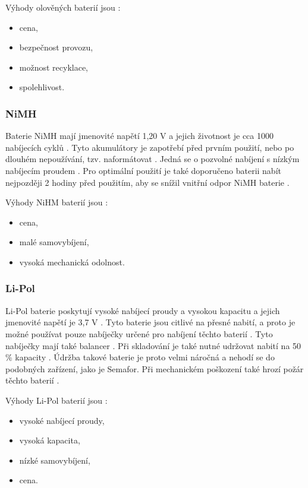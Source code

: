 Výhody olověných baterií jsou \cite{olovene}:
\begin{itemize}
  \item cena,
  \item bezpečnost provozu,
  \item možnost recyklace,
  \item spolehlivost. 
\end{itemize}

\subsubsection{NiMH}
Baterie NiMH mají jmenovité napětí 1,20 V a jejich životnost je cca 1000 nabíjecích cyklů \cite{akumulatory}. Tyto akumulátory je zapotřebí před prvním použití, nebo po 
dlouhém nepoužívání, tzv. naformátovat \cite{akumulatory}. 
Jedná se o pozvolné nabíjení s nízkým nabíjecím proudem \cite{akumulatory}. Pro optimální použití je také doporučeno baterii nabít nejpozději 2 hodiny před použitím, aby se 
snížil vnitřní odpor NiMH baterie \cite{akumulatory}.

Výhody NiHM baterií jsou \cite{akumulatory}:
\begin{itemize}
  \item cena,
  \item malé samovybíjení,
  \item vysoká mechanická odolnost.
\end{itemize}

\subsubsection{Li-Pol}
Li-Pol baterie poskytují vysoké nabíjecí proudy a vysokou kapacitu a jejich jmenovité napětí je 3,7 V \cite{akumulatory}. Tyto baterie jsou citlivé na přesné nabití, a proto 
je možné používat pouze nabíječky určené pro nabíjení těchto baterií \cite{akumulatory}. Tyto nabíječky mají také balancer \cite{akumulatory}. Při skladování je také nutné 
udržovat nabití na 50 \% kapacity \cite{akumulatory}. Údržba takové baterie je proto velmi náročná a nehodí se do podobných zařízení, jako je Semafor. Při mechanickém poškození 
také hrozí požár těchto baterií \cite{akumulatory}.

Výhody Li-Pol baterií jsou \cite{akumulatory}:
\begin{itemize}
  \item vysoké nabíjecí proudy, 
  \item vysoká kapacita, 
  \item nízké samovybíjení,
  \item cena.
\end{itemize}

